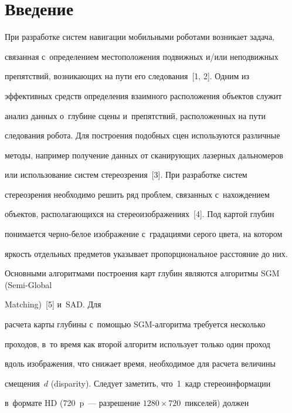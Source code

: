       


      \vspace*{-18pt} 


  


\section{Введение}





  При разработке систем навигации мобильными роботами возникает задача, 


связанная с~определением местоположения подвижных и\!/\!или неподвижных 


препятствий, возникающих на пути его следования~[1, 2]. Одним из 


эффективных средств определения взаимного расположения объектов служит 


анализ данных о~глубине сцены и~препятствий, расположенных на пути 


следования робота. Для построения подобных сцен используются различные 


методы, например получение данных от сканирующих лазерных дальномеров 


или использование систем стереозрения~[3]. При разработке систем 


стереозрения необходимо решить ряд проблем, связанных с~нахождением 


объектов, располагающихся на стереоизображениях~[4]. Под картой глубин 


понимается чер\-но-бе\-лое изображение с~градациями серого цвета, на котором 


яркость отдельных предметов указывает пропорциональное расстояние до них. 


Основными алгоритмами построения карт глубин являются алгоритмы SGM (Semi-Global 


Matching)~[5] и~SAD. Для 


расчета карты глубины с~по\-мощью SGM-ал\-го\-рит\-ма требуется несколько 


проходов, в~то время как второй алгоритм использует только один проход 


вдоль изображения, что снижает время, необходимое для расчета величины 


смещения~$d$ (disparity). Следует заметить, что~1~кадр стереоинформации 


в~формате HD (720~p~--- разрешение $1280\times720$~пикселей) должен 


